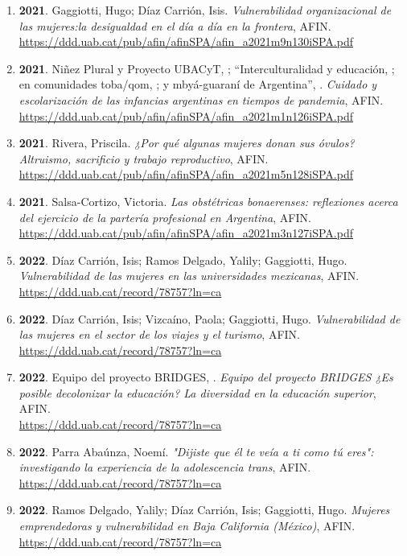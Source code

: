 \begin{enumerate}
\item {\bf 2021}. Gaggiotti, Hugo; Díaz Carrión, Isis. {\it Vulnerabilidad organizacional de las mujeres:la desigualdad en el día a día en la frontera}, AFIN. \\ \url{ https://ddd.uab.cat/pub/afin/afinSPA/afin\_a2021m9n130iSPA.pdf }\filbreak
\item {\bf 2021}. Niñez Plural y Proyecto UBACyT, ; “Interculturalidad y educación, ; en comunidades toba/qom, ; y mbyá-guaraní de Argentina”, . {\it Cuidado y escolarización de las infancias argentinas en tiempos de pandemia}, AFIN. \\ \url{ https://ddd.uab.cat/pub/afin/afinSPA/afin\_a2021m1n126iSPA.pdf }\filbreak
\item {\bf 2021}. Rivera, Priscila. {\it ¿Por qué algunas mujeres donan sus óvulos? Altruismo, sacrificio y trabajo reproductivo}, AFIN. \\ \url{ https://ddd.uab.cat/pub/afin/afinSPA/afin\_a2021m5n128iSPA.pdf }\filbreak
\item {\bf 2021}. Salsa-Cortizo, Victoria. {\it Las obstétricas bonaerenses: reflexiones acerca del ejercicio de la partería profesional en Argentina}, AFIN. \\ \url{ https://ddd.uab.cat/pub/afin/afinSPA/afin\_a2021m3n127iSPA.pdf }\filbreak
\item {\bf 2022}. Díaz Carrión, Isis; Ramos Delgado, Yalily; Gaggiotti, Hugo. {\it Vulnerabilidad de las mujeres en las universidades mexicanas}, AFIN. \\ \url{ https://ddd.uab.cat/record/78757?ln=ca }\filbreak
\item {\bf 2022}. Díaz Carrión, Isis; Vizcaíno, Paola; Gaggiotti, Hugo. {\it Vulnerabilidad de las mujeres en el sector de los viajes y el turismo}, AFIN. \\ \url{ https://ddd.uab.cat/record/78757?ln=ca }\filbreak
\item {\bf 2022}. Equipo del proyecto BRIDGES, . {\it Equipo del proyecto BRIDGES ¿Es posible decolonizar la educación? La diversidad en la educación superior}, AFIN. \\ \url{ https://ddd.uab.cat/record/78757?ln=ca }\filbreak
\item {\bf 2022}. Parra Abaúnza, Noemí. {\it "Dijiste que él te veía a ti como tú eres": investigando la experiencia de la adolescencia trans}, AFIN. \\ \url{ https://ddd.uab.cat/record/78757?ln=ca }\filbreak
\item {\bf 2022}. Ramos Delgado, Yalily; Díaz Carrión, Isis; Gaggiotti, Hugo. {\it Mujeres emprendedoras y vulnerabilidad en Baja California (México)}, AFIN. \\ \url{ https://ddd.uab.cat/record/78757?ln=ca }\filbreak

\end{enumerate}
